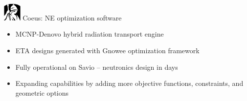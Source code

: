 \documentclass[xcolor=x11names,compress]{beamer}
\renewcommand{\(}{\begin{columns}}
\renewcommand{\)}{\end{columns}}
\newcommand{\<}[1]{\begin{column}{#1}}
\renewcommand{\>}{\end{column}}
\begin{document}
\begin{frame}{\includegraphics[width=0.35in]{../figs/Coeus.jpg}  \hspace{0.25cm}  Coeus: NE optimization software}
  
  \begin{itemize}
    \item MCNP-Denovo hybrid radiation transport engine \cite{MCNP2008, ORNL2015, Evans2010}
    \item ETA designs generated with Gnowee optimization framework 
    \item Fully operational on Savio -- neutronics design in days
    \item Expanding capabilities by adding more objective functions, constraints, and geometric options     
  \end{itemize}
  
%  
\end{frame}
\end{document}
